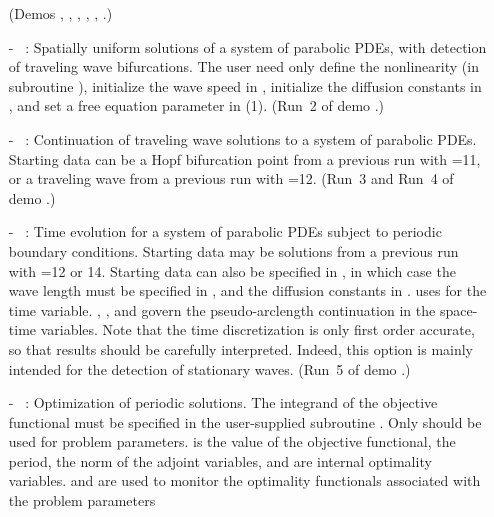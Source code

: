 \begin{itemize}
 (Demos , , , , ,
  .)
\item[-] ~: 
  Spatially uniform solutions of a system of parabolic PDEs,
  with detection of traveling wave bifurcations.
  The user need only define the nonlinearity (in subroutine ),
  initialize the wave speed in , initialize the diffusion 
  constants in , and set a free equation parameter 
  in (1).
  (Run~2 of demo .)
\item[-] ~: 
  Continuation of traveling wave solutions to a system of parabolic PDEs.
  Starting data can be a Hopf bifurcation point from a previous run 
  with =11, or a traveling wave from a previous run with =12.
  (Run~3  and Run~4 of demo .)
\item[-] ~:  
  Time evolution for a system of parabolic PDEs subject to periodic 
  boundary conditions. 
  Starting data may be solutions from a previous run with =12 or 14. 
  Starting data can also be specified in , in which case
  the wave length must be specified in , and the diffusion
  constants in .
  \AUTO uses  for the time variable.
  , , and  govern the pseudo-arclength continuation 
  in the space-time variables.
  Note that the time discretization is only first order accurate, 
  so that results should be carefully interpreted. 
  Indeed, this option is mainly intended for the detection of stationary 
  waves.
  (Run~5 of demo .)
\item[-] ~:   
  Optimization of periodic solutions. The integrand of the
  objective functional must be specified in the user-supplied
  subroutine . Only  should be used for
  problem parameters.  is the value of the objective
  functional,  the period,  the norm of the
  adjoint variables,  and  are internal optimality
  variables.  and  are used to monitor the 
  optimality functionals associated with the problem parameters 

\end{itemize}

